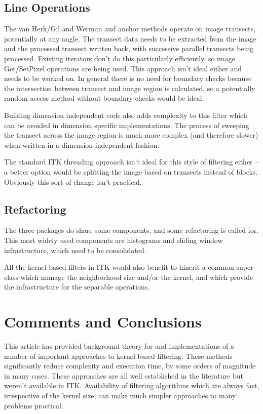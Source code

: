 \documentclass{InsightArticle}
\begin{document}
\subsection{Line Operations}
The van Herk/Gil and Werman and anchor methods operate on image transects, potentially
at any angle. The transect data needs to be extracted from the image and the processed
transect written back, with successive parallel transects being processed. 
Existing iterators don't do this particularly efficiently, so image Get/SetPixel operations 
are being used. This approach isn't ideal either and needs to be worked on. In general
there is no need for boundary checks because the intersection between transect and image region
is calculated, so a potentially random access method without boundary checks would be ideal.

Building dimension independent code also adds complexity to this filter which can be avoided in
dimension specific implementations. The process of sweeping the transect across the image region
is much more complex (and therefore slower) when written in a dimension independent fashion.

The standard ITK threading approach isn't ideal for this style of filtering either -- a better 
option would be splitting the image based on transects instead of blocks. Obviously this
sort of change isn't practical.

\subsection{Refactoring}
The three packages do share some components, and some refactoring is
called for. This most widely used components are histograms and
sliding window infrastructure, which need to be consolidated.

All the kernel based filters in ITK would also benefit to hinerit a common
super class which manage the neighborhood size and/or the kernel, and which
provide the infrastructure for the separable operations.

\section{Comments and Conclusions}
This article has provided background theory for and implementations of
a number of important approaches to kernel based filtering. These
methods significantly reduce complexity and execution time, by some
orders of magnitude in many cases. These approaches are all well
established in the literature but weren't available in
ITK. Availability of filtering algorithms which are always fast,
irrespective of the kernel size, can make much simpler approaches to
many problems practical.
\end{document}
